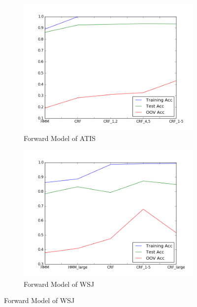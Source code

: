 \documentclass[journal, a4paper]{IEEEtran}
\begin{document}
\begin{figure}
        \begin{subfigure}[b]{0.24\textwidth}
                \includegraphics[width=\linewidth]{atis}
                \caption{Forward Model of ATIS}
                \label{fig:gull}
        \end{subfigure}%
        \hspace{\fill}
        \begin{subfigure}[b]{0.24\textwidth}
                \includegraphics[width=\linewidth]{wsj}
                \caption{Forward Model of WSJ}
                \label{fig:gull2}
        \end{subfigure}%
        \hspace{\fill}

\end{figure}
\end{document}

